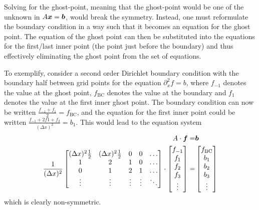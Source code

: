 Solving for the ghost-point, meaning that the ghost-point would be one of the unknown in $A\boldsymbol{x}=\boldsymbol{b}$, would break the symmetry.
Instead, one must reformulate the boundary condition in a way such that it becomes an equation for the ghost point.
The equation of the ghost point can then be substituted into the equations for the first/last inner point (the point just before the boundary) and thus effectively eliminating the ghost point from the set of equations.

To exemplify, consider a second order Dirichlet boundary condition with the boundary half between grid points for the equation $\partial_x^2 f = b$, where $f_{-1}$ denotes the value at the ghost point, $f_{\text{BC}}$ denotes the value at the boundary and $f_{1}$ denotes the value at the first inner ghost point.
The boundary condition can now be written $\frac{f_{-1}+f_{1}}{2}=f_{\text{BC}}$, and the equation for the first inner point could be written $\frac{f_{-1}+2f{1}+f_{2}}{(\Delta x)^2}=b_1$.
This would lead to the equation system
%
\begin{align*}
    A\cdot\boldsymbol{f}=&\boldsymbol{b}\\
    \frac{1}{(\Delta x)^2}
    \begin{bmatrix}
        (\Delta x)^2\frac{1}{2} & (\Delta x)^2\frac{1}{2} & 0 & 0 & \ldots\\
        1                       & 2                       & 1 & 0 & \ldots\\
        0                       & 1                       & 2 & 1 & \ldots\\
        \vdots                  & \vdots              &\vdots&\vdots&\ddots\\
    \end{bmatrix}
    \cdot
    \begin{bmatrix}
        f_{-1}\\
        f_{1}\\
        f_{2}\\
        f_{3}\\
        \vdots
    \end{bmatrix}
    =&
    \begin{bmatrix}
        f_{\text{BC}}\\
        b_{1}\\
        b_{2}\\
        b_{3}\\
        \vdots
    \end{bmatrix}
\end{align*}
%
which is clearly non-symmetric.

